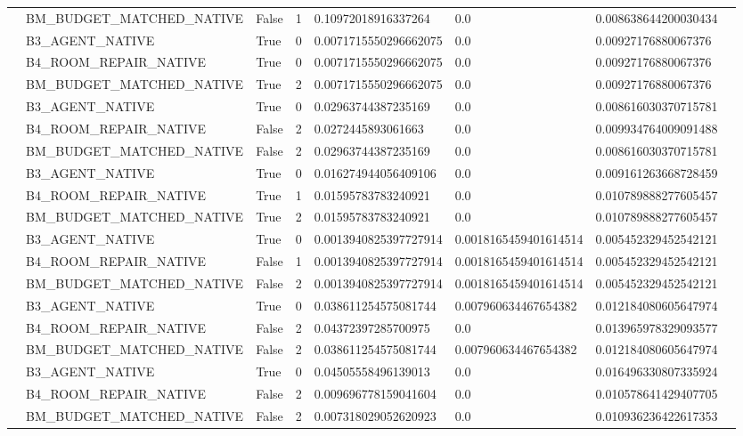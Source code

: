 \begin{tabular}{llllllll}
 & BM\_BUDGET\_MATCHED\_NATIVE & False & 1 & 0.10972018916337264 & 0.0 & 0.008638644200030434 &  \\
 & B3\_AGENT\_NATIVE & True & 0 & 0.0071715550296662075 & 0.0 & 0.00927176880067376 &  \\
 & B4\_ROOM\_REPAIR\_NATIVE & True & 0 & 0.0071715550296662075 & 0.0 & 0.00927176880067376 &  \\
 & BM\_BUDGET\_MATCHED\_NATIVE & True & 2 & 0.0071715550296662075 & 0.0 & 0.00927176880067376 &  \\
 & B3\_AGENT\_NATIVE & True & 0 & 0.02963744387235169 & 0.0 & 0.008616030370715781 &  \\
 & B4\_ROOM\_REPAIR\_NATIVE & False & 2 & 0.0272445893061663 & 0.0 & 0.009934764009091488 &  \\
 & BM\_BUDGET\_MATCHED\_NATIVE & False & 2 & 0.02963744387235169 & 0.0 & 0.008616030370715781 &  \\
 & B3\_AGENT\_NATIVE & True & 0 & 0.016274944056409106 & 0.0 & 0.009161263668728459 &  \\
 & B4\_ROOM\_REPAIR\_NATIVE & True & 1 & 0.01595783783240921 & 0.0 & 0.010789888277605457 &  \\
 & BM\_BUDGET\_MATCHED\_NATIVE & True & 2 & 0.01595783783240921 & 0.0 & 0.010789888277605457 &  \\
 & B3\_AGENT\_NATIVE & True & 0 & 0.0013940825397727914 & 0.0018165459401614514 & 0.005452329452542121 &  \\
 & B4\_ROOM\_REPAIR\_NATIVE & False & 1 & 0.0013940825397727914 & 0.0018165459401614514 & 0.005452329452542121 &  \\
 & BM\_BUDGET\_MATCHED\_NATIVE & False & 2 & 0.0013940825397727914 & 0.0018165459401614514 & 0.005452329452542121 &  \\
 & B3\_AGENT\_NATIVE & True & 0 & 0.038611254575081744 & 0.007960634467654382 & 0.012184080605647974 &  \\
 & B4\_ROOM\_REPAIR\_NATIVE & False & 2 & 0.04372397285700975 & 0.0 & 0.013965978329093577 &  \\
 & BM\_BUDGET\_MATCHED\_NATIVE & False & 2 & 0.038611254575081744 & 0.007960634467654382 & 0.012184080605647974 &  \\
 & B3\_AGENT\_NATIVE & True & 0 & 0.04505558496139013 & 0.0 & 0.016496330807335924 &  \\
 & B4\_ROOM\_REPAIR\_NATIVE & False & 2 & 0.009696778159041604 & 0.0 & 0.010578641429407705 &  \\
 & BM\_BUDGET\_MATCHED\_NATIVE & False & 2 & 0.007318029052620923 & 0.0 & 0.010936236422617353 &  \\

\end{tabular}
